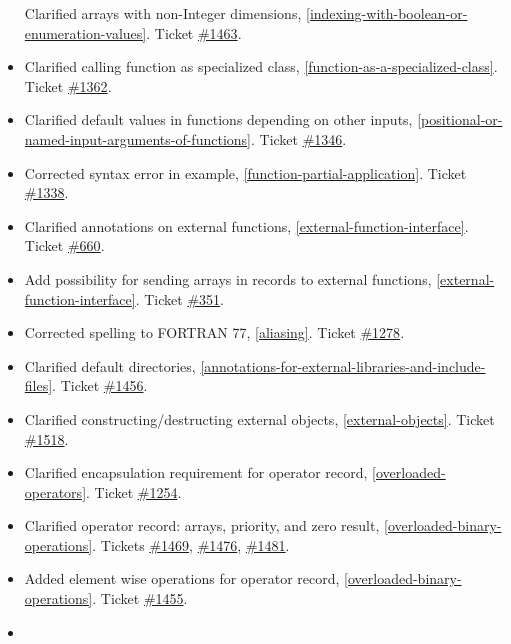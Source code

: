 \begin{itemize}
  Clarified arrays with non-Integer dimensions, \ref{indexing-with-boolean-or-enumeration-values}. Ticket
  \href{https://trac.modelica.org/Modelica/ticket/1463}{\#1463}.
\item
  Clarified calling function as specialized class, \ref{function-as-a-specialized-class}. Ticket
  \href{https://trac.modelica.org/Modelica/ticket/1362}{\#1362}.
\item
  Clarified default values in functions depending on other inputs,
  \ref{positional-or-named-input-arguments-of-functions}. Ticket
  \href{https://trac.modelica.org/Modelica/ticket/1346}{\#1346}.
\item
  Corrected syntax error in example, \ref{function-partial-application}. Ticket
  \href{https://trac.modelica.org/Modelica/ticket/1338}{\#1338}.
\item
  Clarified annotations on external functions, \ref{external-function-interface}. Ticket
  \href{https://trac.modelica.org/Modelica/ticket/660}{\#660}.
\item
  Add possibility for sending arrays in records to external functions,
  \ref{external-function-interface}. Ticket
  \href{https://trac.modelica.org/Modelica/ticket/351}{\#351}.
\item
  Corrected spelling to FORTRAN 77, \ref{aliasing}. Ticket
  \href{https://trac.modelica.org/Modelica/ticket/1278}{\#1278}.
\item
  Clarified default directories, \ref{annotations-for-external-libraries-and-include-files}. Ticket
  \href{https://trac.modelica.org/Modelica/ticket/1456}{\#1456}.
\item
  Clarified constructing/destructing external objects, \ref{external-objects}.
  Ticket \href{https://trac.modelica.org/Modelica/ticket/1518}{\#1518}.
\item
  Clarified encapsulation requirement for operator record, \ref{overloaded-operators}.
  Ticket \href{https://trac.modelica.org/Modelica/ticket/1254}{\#1254}.
\item
  Clarified operator record: arrays, priority, and zero result, 
  \ref{overloaded-binary-operations}. Tickets
  \href{https://trac.modelica.org/Modelica/ticket/1469}{\#1469},
  \href{https://trac.modelica.org/Modelica/ticket/1476}{\#1476},
  \href{https://trac.modelica.org/Modelica/ticket/1481}{\#1481}.
\item
  Added element wise operations for operator record, \ref{overloaded-binary-operations}.
  Ticket \href{https://trac.modelica.org/Modelica/ticket/1455}{\#1455}.
\item

\end{itemize}
